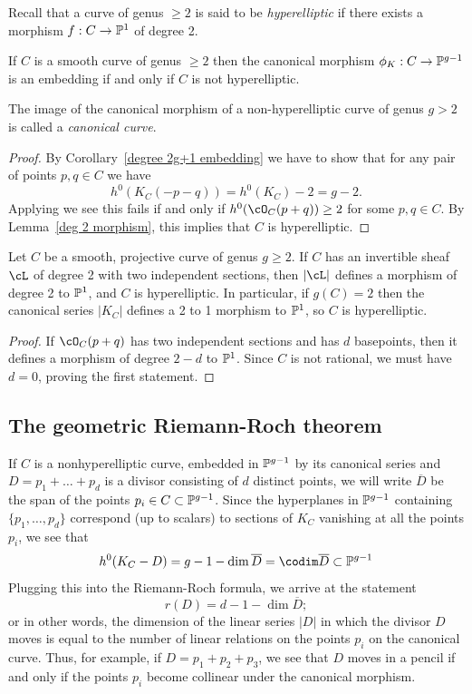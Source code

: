 Recall that a curve of genus $\geq 2$
is said to be \emph{hyperelliptic} if there exists a morphism $f: C \to \PP^1$ of degree 2. 


\begin{theorem}\label{canonical series is very ample}
If $C$ is a smooth curve of genus $\geq 2$ then the canonical morphism $\phi_K : C \to \PP^{g-1}$ is an embedding if and only if $C$ is not hyperelliptic. 
\end{theorem}

The image of the canonical morphism of a non-hyperelliptic curve of genus $g>2$ is called a \emph{canonical curve}.

\begin{proof}
By Corollary~\ref{degree 2g+1 embedding} we have to show that for any pair of points $p, q \in C$ we have
$$
h^0(K_C(-p-q)) = h^0(K_C)-2 = g-2.
$$
Applying \trr we see this fails if and only if $h^0(\cO_C(p+q)) \geq 2$ for some $p,q \in C$. By Lemma~\ref{deg 2 morphism}, this implies that $C$ is hyperelliptic.
\end{proof}

\begin{lemma}\label{deg 2 morphism}
Let $C$ be a smooth, projective curve of genus $g\geq 2$. If $C$ has an invertible sheaf $\cL$ of degree 2 with two independent sections, then
$|\cL|$ defines a morphism of degree 2 to $\PP^{1}$, and $C$ is hyperelliptic. In particular, if $g(C) = 2$ then the canonical series $|K_{C}|$ defines a 2 to 1 morphism to $\PP^{1}$, so $C$ is hyperelliptic.
\end{lemma}

\begin{proof}
If $\cO_C(p+q)$ has two independent sections and has $d$ basepoints, then it defines a morphism of degree $2-d$ to $\PP^1$. Since $C$ is not rational,
we must have $d=0$, proving the first statement. 
\end{proof}

\subsection{The geometric Riemann-Roch theorem}

If $C$ is a nonhyperelliptic curve, embedded in $\PP^{g-1}$ by its canonical series and  $D = p_1+\dots + p_d$ is a divisor consisting of $d$ distinct points, we will write $\overline D$ be the span of the points $p_i \in C \subset \PP^{g-1}$. Since the hyperplanes in $\PP^{g-1}$ containing $\{p_1,\dots,p_d\}$ correspond (up to scalars) to sections of $K_C$ vanishing at all the points $p_i$, we see that
$$
h^0(K_C-D) = g - 1 - \dim \overline D = \codim \overline D \subset \PP^{g-1}
$$
Plugging this into the Riemann-Roch formula, we arrive at the statement
$$
r(D) = d - 1 - \dim \overline D;
$$
or in other words, the dimension of the linear series $|D|$ in which the divisor $D$ moves is equal to the number of linear relations on the points $p_i$ on the canonical curve. Thus, for example, if $D = p_1+p_2+p_3$, we see that $D$ moves in a pencil if and only if the points $p_i$ become collinear under the canonical morphism.

